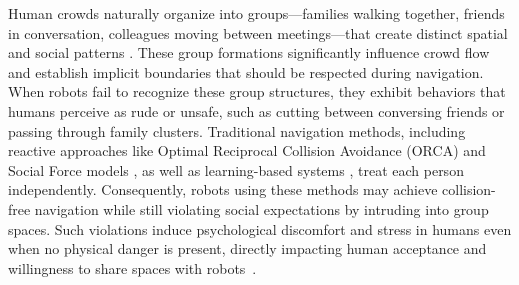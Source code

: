 
Human crowds naturally organize into groups—families walking together, friends in conversation, colleagues moving between meetings—that create distinct spatial and social patterns \cite{moussaid2010walking}. These group formations significantly influence crowd flow and establish implicit boundaries that should be respected during navigation. When robots fail to recognize these group structures, they exhibit behaviors that humans perceive as rude or unsafe, such as cutting between conversing friends or passing through family clusters. Traditional navigation methods, including reactive approaches like Optimal Reciprocal Collision Avoidance (ORCA) \cite{orca} and Social Force models \cite{helbing1995social}, as well as learning-based systems \cite{liu2020decentralized, liu2023intention}, treat each person independently. Consequently, robots using these methods may achieve collision-free navigation while still violating social expectations by intruding into group spaces. Such violations induce psychological discomfort and stress in humans even when no physical danger is present, directly impacting human acceptance and willingness to share spaces with robots~\cite{gao2022evaluation}.



